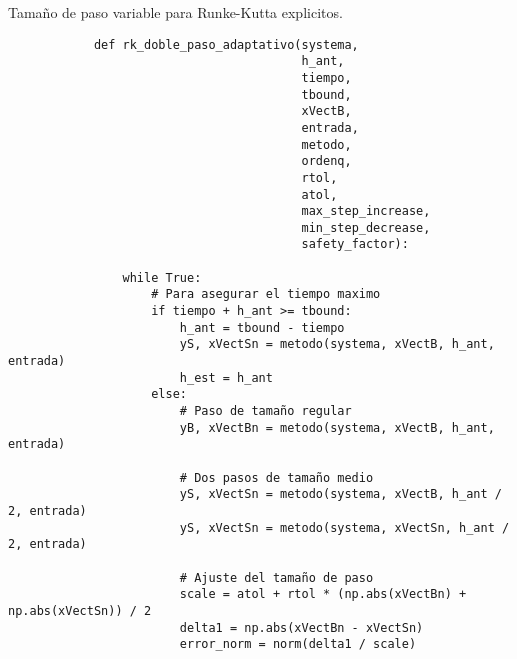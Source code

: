     
    \begin{longlisting}
        \caption[Tamaño de paso variable para Runke-Kutta explicitos]{Tamaño de paso variable para Runke-Kutta explicitos.}
        \label{code:explicitos}				
        \begin{verbatim}
            def rk_doble_paso_adaptativo(systema,
                                         h_ant,
                                         tiempo,
                                         tbound,
                                         xVectB,
                                         entrada,
                                         metodo,
                                         ordenq,
                                         rtol,
                                         atol,
                                         max_step_increase,
                                         min_step_decrease,
                                         safety_factor):

                while True:
                    # Para asegurar el tiempo maximo
                    if tiempo + h_ant >= tbound:
                        h_ant = tbound - tiempo
                        yS, xVectSn = metodo(systema, xVectB, h_ant, entrada)
                        h_est = h_ant
                    else:
                        # Paso de tamaño regular
                        yB, xVectBn = metodo(systema, xVectB, h_ant, entrada)

                        # Dos pasos de tamaño medio
                        yS, xVectSn = metodo(systema, xVectB, h_ant / 2, entrada)
                        yS, xVectSn = metodo(systema, xVectSn, h_ant / 2, entrada)

                        # Ajuste del tamaño de paso
                        scale = atol + rtol * (np.abs(xVectBn) + np.abs(xVectSn)) / 2
                        delta1 = np.abs(xVectBn - xVectSn)
                        error_norm = norm(delta1 / scale)


\end{verbatim}
\end{longlisting}
